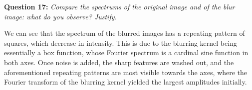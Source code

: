 


\textbf{Question 17:}
\textit{Compare the spectrums of the original image and of the blur image: what do you observe? Justify.}

We can see that the spectrum of the blurred images has a repeating pattern of squares, which decrease in intensity. This is due to the blurring kernel being essentially a box function, whose Fourier spectrum is a cardinal sine function in both axes. Once noise is added, the sharp features are washed out, and the aforementioned repeating patterns are most visible towards the axes, where the Fourier transform of the blurring kernel yielded the largest amplitudes initially.

